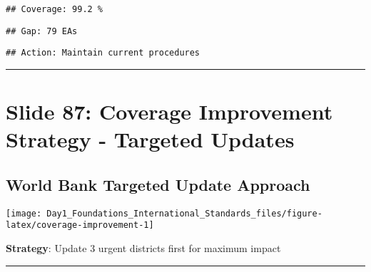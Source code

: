 \documentclass[
]{article}
\newenvironment{Shaded}{\begin{snugshade}}{\end{snugshade}}
\newcommand{\FunctionTok}[1]{\textcolor[rgb]{0.13,0.29,0.53}{\textbf{#1}}}
\newcommand{\NormalTok}[1]{#1}
\newcommand{\SpecialCharTok}[1]{\textcolor[rgb]{0.81,0.36,0.00}{\textbf{#1}}}
\newcommand{\StringTok}[1]{\textcolor[rgb]{0.31,0.60,0.02}{#1}}
\begin{document}
\begin{verbatim}
## Coverage: 99.2 %
\end{verbatim}

\begin{Shaded}
\end{Shaded}

\begin{verbatim}
## Gap: 79 EAs
\end{verbatim}

\begin{Shaded}
\end{Shaded}

\begin{verbatim}
## Action: Maintain current procedures
\end{verbatim}

\begin{center}\rule{0.5\linewidth}{0.5pt}\end{center}

\section{Slide 87: Coverage Improvement Strategy - Targeted
Updates}\label{slide-87-coverage-improvement-strategy---targeted-updates}

\subsection{World Bank Targeted Update
Approach}\label{world-bank-targeted-update-approach}

\texttt{[image: Day1\_Foundations\_International\_Standards\_files/figure-latex/coverage-improvement-1]}

\textbf{Strategy}: Update 3 urgent districts first for maximum impact

\begin{center}\rule{0.5\linewidth}{0.5pt}\end{center}
\end{document}
